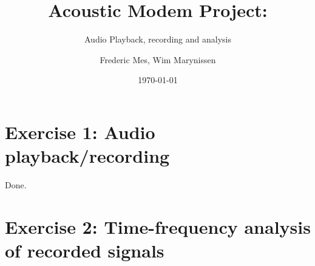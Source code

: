 \documentclass[a4paper,11pt]{article}
\title{ Acoustic Modem Project:}
\subtitle{Audio Playback, recording and analysis}
\author{Frederic Mes, Wim Marynissen}
\date{\today}
\begin{document}
\maketitle

\section{Exercise 1: Audio playback/recording}
Done.


\section{Exercise 2: Time-frequency analysis of recorded signals}
\end{document}
